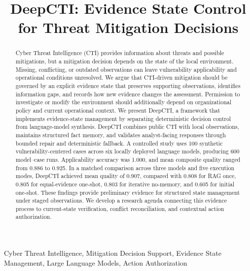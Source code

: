 \documentclass[conference]{IEEEtran}
\begin{document}
\title{DeepCTI: Evidence State Control for Threat Mitigation Decisions}


\author{
}

\maketitle
\begin{abstract}
Cyber Threat Intelligence (CTI) provides information about threats and possible mitigations, but a mitigation decision depends on the state of the local environment. Missing, conflicting, or outdated observations can leave vulnerability applicability and operational conditions unresolved. We argue that CTI-driven mitigation should be governed by an explicit evidence state that preserves supporting observations, identifies information gaps, and records how new evidence changes the assessment. Permission to investigate or modify the environment should additionally depend on organizational policy and current operational context. We present DeepCTI, a framework that implements evidence-state management by separating deterministic decision control from language-model synthesis. DeepCTI combines public CTI with local observations, maintains structured fact memory, and validates analyst-facing responses through bounded repair and deterministic fallback. A controlled study uses 100 synthetic vulnerability-centered cases across six locally deployed language models, producing 600 model--case runs. Applicability accuracy was 1.000, and mean composite quality ranged from 0.886 to 0.925. In a matched comparison across three models and five execution modes, DeepCTI achieved mean quality of 0.907, compared with 0.808 for RAG once, 0.805 for equal-evidence one-shot, 0.803 for iterative no-memory, and 0.605 for initial one-shot. These findings provide preliminary evidence for structured state management under staged observations. We develop a research agenda connecting this evidence process to current-state verification, conflict reconciliation, and contextual action authorization.
\end{abstract}

\begin{IEEEkeywords}
Cyber Threat Intelligence, Mitigation Decision Support, Evidence State Management, Large Language Models, Action Authorization
\end{IEEEkeywords}
\end{document}
